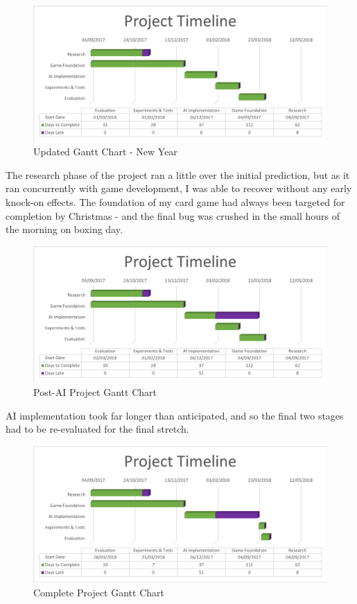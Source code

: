 \documentclass[12pt,a4paper]{article}
\begin{document}
\begin{figure}[h]
	\centering
	\includegraphics[width = \textwidth]{Gantt2.png}
	\caption{Updated Gantt Chart - New Year}
\end{figure}

The research phase of the project ran a little over the initial prediction, but as it ran concurrently with game development, I was able to recover without any early knock-on effects. The foundation of my card game had always been targeted for completion by Christmas - and the final bug was crushed in the small hours of the morning on boxing day. 

\begin{figure}[h]
	\centering
	\includegraphics[width = \textwidth]{Gantt3.png}
	\caption{Post-AI Project Gantt Chart}
\end{figure}

AI implementation took far longer than anticipated, and so the final two stages had to be re-evaluated for the final stretch. 

\begin{figure}[h]
	\centering
	\includegraphics[width = \textwidth]{Gantt4.png}
	\caption{Complete Project Gantt Chart}
\end{figure}
\end{document}
